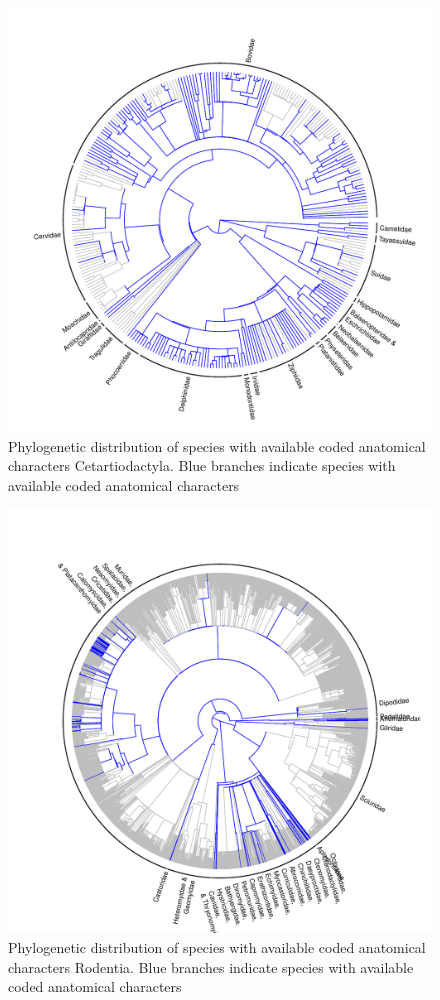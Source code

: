 \documentclass[12pt,letterpaper]{article}
\begin{document}
\begin{figure}[!htbp]
\centering
    \includegraphics[width=1\textwidth]{Supp_figure_CETARTIODACTYLA.pdf}
\caption{Phylogenetic distribution of species with available coded anatomical characters Cetartiodactyla. Blue branches indicate species with available coded anatomical characters}
\label{Supp_Figure_Phylo-Primates}
\end{figure}

\begin{figure}[!htbp]
\centering
    \includegraphics[width=1\textwidth]{Supp_figure_RODENTIA.pdf}
\caption{Phylogenetic distribution of species with available coded anatomical characters Rodentia. Blue branches indicate species with available coded anatomical characters}
\label{Supp_Figure_Phylo-Rodentia}
\end{figure}
\end{document}

